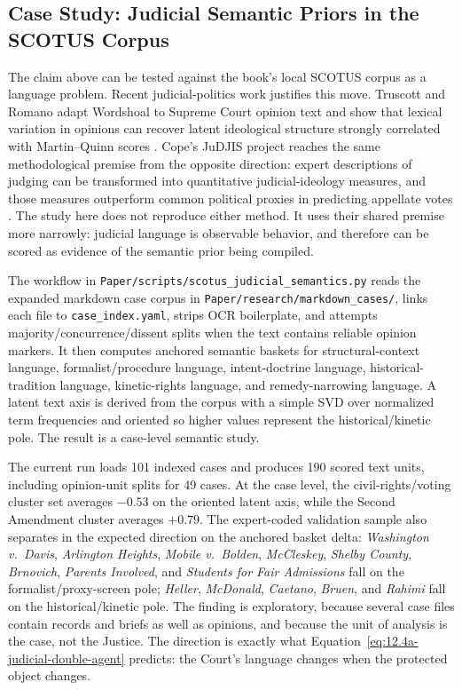 \subsection{Case Study: Judicial Semantic Priors in the SCOTUS Corpus}

The claim above can be tested against the book's local SCOTUS corpus as a language problem. Recent judicial-politics work justifies this move. Truscott and Romano adapt Wordshoal to Supreme Court opinion text and show that lexical variation in opinions can recover latent ideological structure strongly correlated with Martin--Quinn scores \cite{truscott_romano_judicial_text_2026}. Cope's JuDJIS project reaches the same methodological premise from the opposite direction: expert descriptions of judging can be transformed into quantitative judicial-ideology measures, and those measures outperform common political proxies in predicting appellate votes \cite{cope_judjis_2025}. The study here does not reproduce either method. It uses their shared premise more narrowly: judicial language is observable behavior, and therefore can be scored as evidence of the semantic prior being compiled.

The workflow in \texttt{Paper/scripts/scotus\_judicial\_semantics.py} reads the expanded markdown case corpus in \texttt{Paper/research/markdown\_cases/}, links each file to \texttt{case\_index.yaml}, strips OCR boilerplate, and attempts majority/concurrence/dissent splits when the text contains reliable opinion markers. It then computes anchored semantic baskets for structural-context language, formalist/procedure language, intent-doctrine language, historical-tradition language, kinetic-rights language, and remedy-narrowing language. A latent text axis is derived from the corpus with a simple SVD over normalized term frequencies and oriented so higher values represent the historical/kinetic pole. The result is a case-level semantic study.

The current run loads 101 indexed cases and produces 190 scored text units, including opinion-unit splits for 49 cases. At the case level, the civil-rights/voting cluster set averages \(-0.53\) on the oriented latent axis, while the Second Amendment cluster averages \(+0.79\). The expert-coded validation sample also separates in the expected direction on the anchored basket delta: \textit{Washington v.\ Davis}, \textit{Arlington Heights}, \textit{Mobile v.\ Bolden}, \textit{McCleskey}, \textit{Shelby County}, \textit{Brnovich}, \textit{Parents Involved}, and \textit{Students for Fair Admissions} fall on the formalist/proxy-screen pole; \textit{Heller}, \textit{McDonald}, \textit{Caetano}, \textit{Bruen}, and \textit{Rahimi} fall on the historical/kinetic pole. The finding is exploratory, because several case files contain records and briefs as well as opinions, and because the unit of analysis is the case, not the Justice. The direction is exactly what Equation~\ref{eq:12.4a-judicial-double-agent} predicts: the Court's language changes when the protected object changes.

